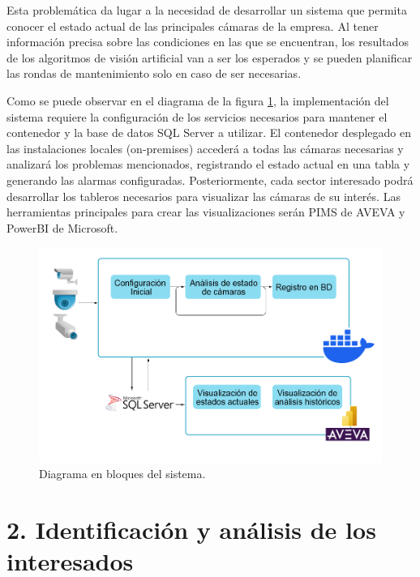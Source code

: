 \documentclass[
11pt, %
]{charter}
\begin{document}
Esta problemática da lugar a la necesidad de desarrollar un sistema que permita conocer el estado actual de las principales cámaras de la empresa. Al tener información precisa sobre las condiciones en las que se encuentran, los resultados de los algoritmos de visión artificial van a ser los esperados y se pueden planificar las rondas de mantenimiento solo en caso de ser necesarias. 

Como se puede observar en el diagrama de la figura \ref{fig:diagrama_solucion}, la implementación del sistema requiere la configuración de los servicios necesarios para mantener el contenedor y la base de datos SQL Server a utilizar. El contenedor desplegado en las instalaciones locales (on-premises) accederá a todas las cámaras necesarias y analizará los problemas mencionados, registrando el estado actual en una tabla y generando las alarmas configuradas. Posteriormente, cada sector interesado podrá desarrollar los tableros necesarios para visualizar las cámaras de su interés. Las herramientas principales para crear las visualizaciones serán PIMS de AVEVA y PowerBI de Microsoft.



\begin{figure}[htpb]
\centering 
\includegraphics[width=.65\textwidth]{./Figuras/diagrama_inicial.png}
\caption{Diagrama en bloques del sistema.}
\label{fig:diagrama_solucion}
\end{figure}

	


\section{2. Identificación y análisis de los interesados} %
\label{sec:interesados}
\end{document}
